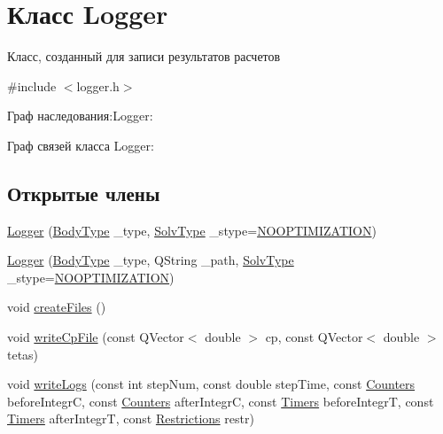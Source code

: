 \hypertarget{class_logger}{}\section{Класс Logger}
\label{class_logger}


Класс, созданный для записи результатов расчетов  




{\ttfamily \#include $<$logger.\+h$>$}



Граф наследования\+:Logger\+:


Граф связей класса Logger\+:
\subsection*{Открытые члены}
\begin{DoxyCompactItemize}
\item 
\mbox{\hyperlink{class_logger_a63280558a11dc4f980ee9963c06629b5}{Logger}} (\mbox{\hyperlink{bodyfragmentation_8h_acf0ce63e34327e5bc336f9fe3d2d47a2}{Body\+Type}} \+\_\+type, \mbox{\hyperlink{logger_8h_adc24da78894b484d82933fbe4da8edc2}{Solv\+Type}} \+\_\+stype=\mbox{\hyperlink{logger_8h_adc24da78894b484d82933fbe4da8edc2ae07c32fbcb5eeb8f8b5cc3fea75af13f}{N\+O\+O\+P\+T\+I\+M\+I\+Z\+A\+T\+I\+ON}})
\item 
\mbox{\hyperlink{class_logger_a615b8e52bd4f3b342faece157dcd6117}{Logger}} (\mbox{\hyperlink{bodyfragmentation_8h_acf0ce63e34327e5bc336f9fe3d2d47a2}{Body\+Type}} \+\_\+type, Q\+String \+\_\+path, \mbox{\hyperlink{logger_8h_adc24da78894b484d82933fbe4da8edc2}{Solv\+Type}} \+\_\+stype=\mbox{\hyperlink{logger_8h_adc24da78894b484d82933fbe4da8edc2ae07c32fbcb5eeb8f8b5cc3fea75af13f}{N\+O\+O\+P\+T\+I\+M\+I\+Z\+A\+T\+I\+ON}})
\item 
void \mbox{\hyperlink{class_logger_a3d3c374b4af641a0f7dd1daef8b0d55c}{create\+Files}} ()
\item 
void \mbox{\hyperlink{class_logger_a2a424d495516f85843b0a717f14c5ec5}{write\+Cp\+File}} (const Q\+Vector$<$ double $>$ cp, const Q\+Vector$<$ double $>$ tetas)
\item 
void \mbox{\hyperlink{class_logger_aa74c810654de96491af58a61f10f0a52}{write\+Logs}} (const int step\+Num, const double step\+Time, const \mbox{\hyperlink{struct_counters}{Counters}} before\+IntegrC, const \mbox{\hyperlink{struct_counters}{Counters}} after\+IntegrC, const \mbox{\hyperlink{struct_timers}{Timers}} before\+IntegrT, const \mbox{\hyperlink{struct_timers}{Timers}} after\+IntegrT, const \mbox{\hyperlink{struct_restrictions}{Restrictions}} restr)

\end{DoxyCompactItemize}
